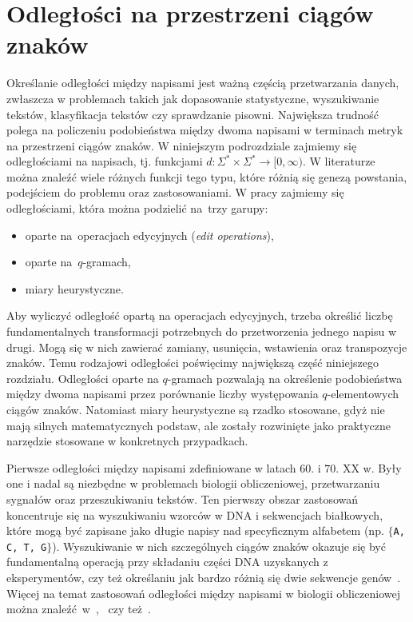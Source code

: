 \documentclass{praca1}
\begin{document}
\section{Odległości na przestrzeni ciągów znaków}

Określanie odległości między napisami jest ważną częścią przetwarzania danych, zwłaszcza w problemach takich jak dopasowanie statystyczne, wyszukiwanie tekstów, klasyfikacja tekstów czy sprawdzanie pisowni. Największa trudność polega na policzeniu podobieństwa między dwoma napisami w terminach metryk na przestrzeni ciągów znaków.  W niniejszym podrozdziale zajmiemy się odległościami na napisach, tj. funkcjami $d: \Sigma^* \times \Sigma^* \rightarrow [0, \infty)$. W literaturze można znaleźć wiele różnych funkcji tego typu, które różnią się genezą powstania, podejściem do problemu oraz zastosowaniami. W pracy zajmiemy się odległościami, która można podzielić na~trzy garupy:
\begin{itemize}
\item oparte na~operacjach edycyjnych (\emph{edit operations}),
\item oparte na~$q$-gramach,
\item miary heurystyczne.
\end{itemize}


Aby wyliczyć odległość opartą na operacjach edycyjnych, trzeba określić liczbę fundamentalnych transformacji potrzebnych do przetworzenia jednego napisu w drugi. Mogą się w nich zawierać zamiany, usunięcia, wstawienia oraz transpozycje znaków. Temu rodzajowi odległości poświęcimy największą część niniejszego rozdziału. Odległości oparte na $q$-gramach pozwalają na określenie podobieństwa między dwoma napisami przez porównanie liczby występowania $q$-elementowych ciągów znaków. Natomiast miary heurystyczne są rzadko stosowane, gdyż nie mają silnych matematycznych podstaw, ale zostały rozwinięte jako praktyczne narzędzie stosowane w konkretnych przypadkach. 

Pierwsze odległości między napisami zdefiniowane w latach $60.$ i $70.$ XX w. Były one i nadal są niezbędne w problemach biologii obliczeniowej, przetwarzaniu sygnałów oraz przeszukiwaniu tekstów. Ten pierwszy obszar zastosowań koncentruje się na wyszukiwaniu wzorców w DNA i sekwencjach białkowych, które mogą być zapisane jako długie napisy nad specyficznym alfabetem (np. $\{$\verb|A, C, T, G|$\}$). Wyszukiwanie w nich szczególnych ciągów znaków okazuje się być fundamentalną operacją przy składaniu części DNA uzyskanych z eksperymentów, czy też określaniu jak bardzo różnią się dwie sekwencje genów~\cite{Navarro2001:guidedtour}. Więcej na temat zastosowań odległości między napisami w biologii obliczeniowej można znaleźć~w~\cite{Sellers1980:evolutionary},~\cite{Needleman1970:proteins} czy też~\cite{Sankoff1983:timewarps}. 
\end{document}

